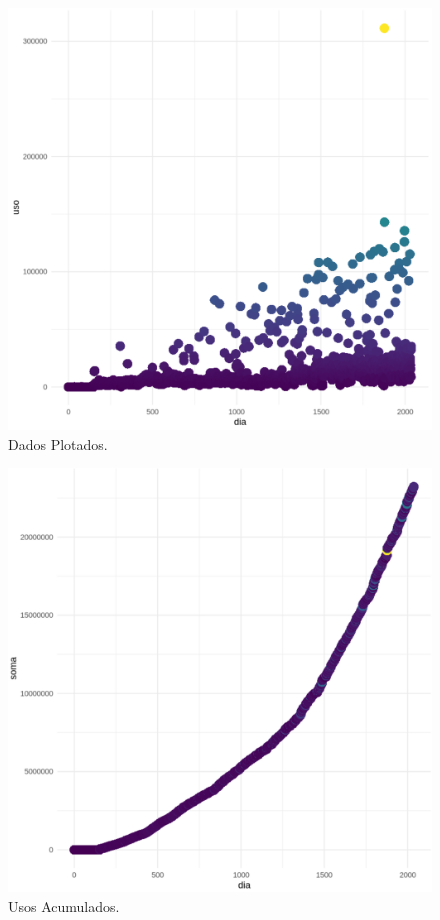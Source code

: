 \documentclass[a4paper,12pt]{article}
\begin{document}
\begin{figure}[h!tb]
     \centering
     \includegraphics[scale=0.45]{RNL_00.png}
     \caption{Dados Plotados.}
     \label{figDados}
\end{figure}

\begin{figure}[h!tb]
     \centering
     \includegraphics[scale=0.45]{RNL_01.png}
     \caption{Usos Acumulados.}
     \label{figAcum}
\end{figure}
\end{document}
